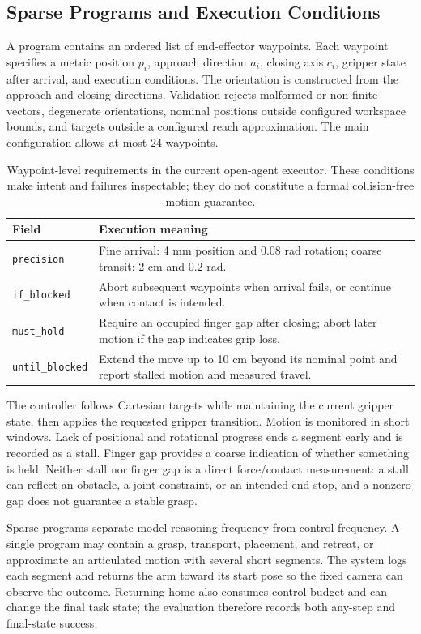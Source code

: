 \subsection{Sparse Programs and Execution Conditions}
A program contains an ordered list of end-effector waypoints. Each waypoint specifies a metric position $p_i$, approach direction $a_i$, closing axis $c_i$, gripper state after arrival, and execution conditions. The orientation is constructed from the approach and closing directions. Validation rejects malformed or non-finite vectors, degenerate orientations, nominal positions outside configured workspace bounds, and targets outside a configured reach approximation. The main configuration allows at most 24 waypoints.

\begin{table}[t]
\centering\small
\begin{tabularx}{\linewidth}{@{}lX@{}}
\toprule
Field & Execution meaning \\
\midrule
\texttt{precision} & Fine arrival: 4 mm position and 0.08 rad rotation; coarse transit: 2 cm and 0.2 rad. \\
\texttt{if\_blocked} & Abort subsequent waypoints when arrival fails, or continue when contact is intended. \\
\texttt{must\_hold} & Require an occupied finger gap after closing; abort later motion if the gap indicates grip loss. \\
\texttt{until\_blocked} & Extend the move up to 10 cm beyond its nominal point and report stalled motion and measured travel. \\
\bottomrule
\end{tabularx}
\caption{Waypoint-level requirements in the current open-agent executor. These conditions make intent and failures inspectable; they do not constitute a formal collision-free motion guarantee.}
\label{tab:contract}
\end{table}

The controller follows Cartesian targets while maintaining the current gripper state, then applies the requested gripper transition. Motion is monitored in short windows. Lack of positional and rotational progress ends a segment early and is recorded as a stall. Finger gap provides a coarse indication of whether something is held. Neither stall nor finger gap is a direct force/contact measurement: a stall can reflect an obstacle, a joint constraint, or an intended end stop, and a nonzero gap does not guarantee a stable grasp.

Sparse programs separate model reasoning frequency from control frequency. A single program may contain a grasp, transport, placement, and retreat, or approximate an articulated motion with several short segments. The system logs each segment and returns the arm toward its start pose so the fixed camera can observe the outcome. Returning home also consumes control budget and can change the final task state; the evaluation therefore records both any-step and final-state success.

